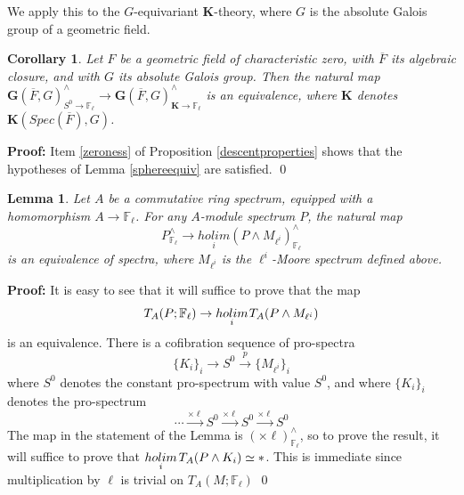 \documentclass[11pt]{article}
\newcommand\mb{\mathbb}
\newcommand\mc{\mathcal}
\def \bK{\mathbf K}
\newcommand\mfk{\mathbf G}
\newtheorem{Lemma}{Lemma}[section]
\newtheorem{Corollary}{Corollary}[section]
\newenvironment{Proof}{\par\noindent\textbf{Proof:}}
{\qed}
\begin{document}
 We apply this to the $G$-equivariant  $\bK$-theory, where $G$ is the absolute Galois group of a geometric field. 

 \begin{Corollary}\label{trivialcorollary}
     Let $F$ be a geometric field of characteristic zero, with $\overline{F}$ its algebraic closure, and  with $G$ its absolute Galois group.  Then the natural map $\mfk(\overline{F},G) ^{\wedge }_{{S^0} \rightarrow \mb{F}_{\ell}} \rightarrow \mfk(\overline{F},G)^{\wedge}_{\bK \rightarrow \mb{F}_{\ell}}$ is an equivalence, where $\bK$ denotes $\bK(Spec(\overline{F}),G) $.  
 \end{Corollary}
 \begin{Proof} Item \ref{zeroness} of Proposition \ref{descentproperties} shows that the hypotheses of Lemma \ref{sphereequiv} are satisfied.  
     \end{Proof}
 \begin{Lemma}\label{Moorestuff}  Let $A$ be a commutative ring spectrum, equipped with a homomorphism $A \rightarrow \mb{F}_{\ell}$. For any $A$-module spectrum $P$, the natural map 
 $$P^{\wedge}_{\mb{F}_{\ell}} \rightarrow \underset{i}{holim} (P \wedge M_{\ell ^i})^{\wedge}_{\mb{F}_{\ell}}$$
is an equivalence of spectra, where $M_{\ell ^i}$ is the $\ell ^i$-Moore spectrum defined above.   
      \end{Lemma}
      \begin{Proof} It is easy to see that it will suffice to prove that the  map 
      $$ T_A(P; \mb{F}_{\ell}) \rightarrow \underset{i}{holim}\hspace{.03cm}T_A(P \wedge M_{\ell ^i})
      $$
      is an equivalence.  There is a cofibration sequence of pro-spectra 
      $$ \{K_i \}_i \rightarrow S^0 \xrightarrow{p} \{ M_{\ell ^i}\}_i
      $$
      where $S^0$ denotes the constant pro-spectrum with value $S^0$, and where $\{ K_i \}_i $ denotes the pro-spectrum 
       $$ \cdots \xrightarrow{\times \ell}  S^0 \xrightarrow{\times \ell}  S^0 \xrightarrow{\times \ell}  S^0
 $$
      The map in the statement of the Lemma is $(\times \ell)^{\wedge}_{\mb{F}_{\ell}}$, so to prove the result, it will suffice to prove that $\underset{i}{holim}\hspace{.05cm} T_A(P \wedge K_i) \simeq *$. This is immediate since multiplication by $\ell$ is trivial on $T_A(M;\mb{F}_{\ell})$ \end{Proof}
      
\end{document}
